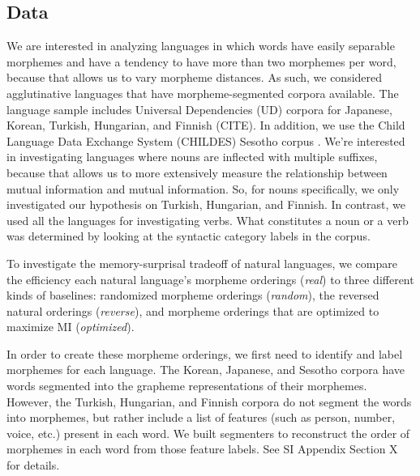 \documentclass[11pt,letterpaper]{article}
\newcommand\mhahn[1]{{\color{red}(#1)}}
\newcommand\becky[1]{{\color{blue}(#1)}}
\begin{document}
\subsection{Data} %

We are interested in analyzing languages in which words have easily separable morphemes and have a tendency to have more than two morphemes per word, because that allows us to vary morpheme distances. As such, we considered agglutinative languages that have morpheme-segmented corpora available. The language sample includes Universal Dependencies (UD) corpora for Japanese, Korean, Turkish, Hungarian, and Finnish (CITE). In addition, we use the Child Language Data Exchange System (CHILDES) Sesotho corpus \citep{demuth1992acquisition}. 
We're interested in investigating languages where nouns are inflected with multiple suffixes, because that allows us to more extensively measure the relationship between mutual information and mutual information. So, for nouns specifically, we only investigated our hypothesis on Turkish, Hungarian, and Finnish. In contrast, we used all the languages for investigating verbs. What constitutes a noun or a verb was determined by looking at the syntactic category labels in the corpus. 

To investigate the memory-surprisal tradeoff of natural languages, we compare the efficiency each natural language's morpheme orderings (\textit{real}) to three different kinds of baselines: randomized morpheme orderings (\textit{random}), the reversed natural orderings (\textit{reverse}), and morpheme orderings that are optimized to maximize MI (\textit{optimized}). 

In order to create these morpheme orderings, we first need to identify and label morphemes for each language. The Korean, Japanese, and Sesotho corpora have words segmented into the grapheme representations of their morphemes. However, the Turkish, Hungarian, and Finnish corpora do not segment the words into morphemes, but rather include a list of features (such as person, number, voice, etc.) present in each word. We built segmenters to reconstruct the order of morphemes in each word from those feature labels. See SI Appendix Section X for details.
\end{document}
